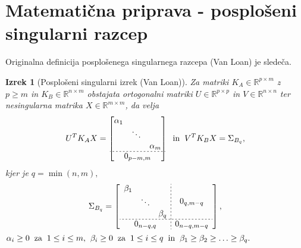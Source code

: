 \documentclass[mat1]{article}
\newtheorem{izrek}{Izrek}
\theoremstyle{definition}
\begin{document}
\section{Matematična priprava - posplošeni singularni razcep}
Originalna definicija posplošenega singularnega razcepa (Van Loan) je sledeča.

\begin{izrek}[Posplošeni singularni izrek (Van Loan)]
\label{izrek:SVD} Za matriki $K_A \in \mathbb{R}^{p \times m}$ z $p \geq m$ in $K_B \in \mathbb{R}^{n \times m}$ obstajata ortogonalni matriki $U \in \mathbb{R}^{p \times p}$ in $V \in \mathbb{R}^{n \times n}$ ter nesingularna matrika $X \in \mathbb{R}^{m \times m}$, da velja 
$$ U^T K_A X = 
\begin{bmatrix}
\begin{matrix}
\alpha_1 & & \\
 & \ddots & \\
 & & \alpha_m
\end{matrix} \\ \hdashline[2pt/2pt]
0_{p-m, m}
\end{bmatrix} 
\hspace{2mm} \text{in} \hspace{2mm}
 V^T K_B X = 
\Sigma_{B_q} \text{,}
$$ kjer je $q = \min(n,m) \text{,}$
\begin{gather*}
\Sigma_{B_q} = 
\left[
\begin{array}{c;{2pt/2pt}c}
\begin{matrix}
\beta_1 & & \\
 & \ddots & \\
 & & \beta_q
\end{matrix} & 0_{q, m - q}
 \\ \hdashline[2pt/2pt]
0_{n-q, q} & 0_{n-q, m-q}
\end{array} \right] \text{,} 
\end{gather*} %
$
\alpha_i \geq 0 \hspace{2mm} \text{za} \hspace{2mm}
 1 \leq i \leq m \text{,} \hspace{2mm}
  \beta_i \geq 0 \hspace{2mm} \text{za} \hspace{2mm} 1 \leq i \leq q
\hspace{2mm} \text{in} \hspace{2mm} \beta_1 \geq \beta_2 \geq \ldots \geq \beta_q
\text{.}
$
\end{izrek}
\end{document}
